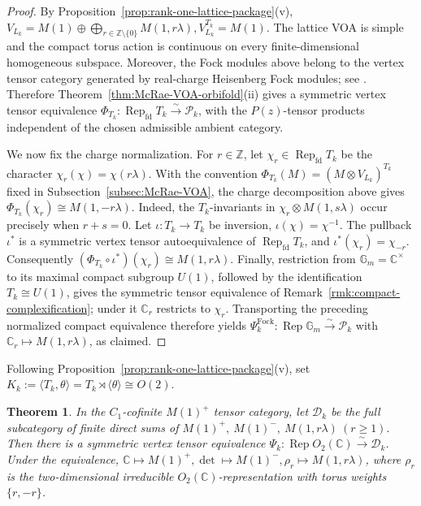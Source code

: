 \documentclass[12pt,leqno]{amsart}
\numberwithin{equation}{section} \newtheorem{thm}{Theorem}[section] \newtheorem{lem}[thm]{Lemma} \newtheorem{ex}[thm]{Example} \newtheorem{prop}[thm]{Proposition} \newtheorem{cor}[thm]{Corollary} \newtheorem{defi}[thm]{Definition} \newtheorem{rmk}[thm]{Remark} \newtheorem{notation}[thm]{Notation}
\newcommand{\Rep}{\operatorname{Rep}}
\newcommand{\Dk}{\mathcal D_k}
\newcommand{\Otwo}{O_2(\C)}
\def\Z{\mathbb{Z}} \def\N{\mathbb{N}} \def\A{\mathbb{A}} \def\C{\mathbb{C}} \def\R{\mathbb{R}} \def\Q{\mathbb{Q}} \def\F{\mathbb{F}}
\begin{document}
\begin{proof}
By Proposition~\ref{prop:rank-one-lattice-package}(v), \(V_{L_k}=M(1)\oplus\bigoplus_{r\in\Z\setminus\{0\}}M(1,r\lambda), V_{L_k}^{T_k}=M(1)\). The lattice VOA is simple and the compact torus action is continuous on every finite-dimensional homogeneous subspace. Moreover, the Fock modules above belong to the vertex tensor category generated by real-charge Heisenberg Fock modules; see \cite[Theorem~2.3]{CKLR}. Therefore Theorem~\ref{thm:McRae-VOA-orbifold}(ii) gives a symmetric vertex tensor equivalence \(\Phi_{T_k}:\Rep_{\mathrm{fd}}T_k\overset{\sim}{\longrightarrow}\mathcal P_k\), with the $P(z)$-tensor products independent of the chosen admissible ambient category.

We now fix the charge normalization. For \(r\in\Z\), let \(\chi_r\in\Rep_{\mathrm{fd}}T_k\) be the character \(\chi_r(\chi)=\chi(r\lambda)\). With the convention \(\Phi_{T_k}(M)=(M\otimes V_{L_k})^{T_k}\) fixed in Subsection~\ref{subsec:McRae-VOA}, the charge decomposition above gives \(\Phi_{T_k}(\chi_r)\cong M(1,-r\lambda)\). Indeed, the $T_k$-invariants in \(\chi_r\otimes M(1,s\lambda)\) occur precisely when \(r+s=0\). Let \(\iota:T_k\to T_k\) be inversion, \(\iota(\chi)=\chi^{-1}\). The pullback \(\iota^*\) is a symmetric vertex tensor autoequivalence of \(\Rep_{\mathrm{fd}}T_k\), and \(\iota^*(\chi_r)=\chi_{-r}\). Consequently \((\Phi_{T_k}\circ\iota^*)(\chi_r)\cong M(1,r\lambda)\). Finally, restriction from \(\mathbb G_m=\C^\times\) to its maximal compact subgroup $U(1)$, followed by the identification $T_k\cong U(1)$, gives the symmetric tensor equivalence of Remark~\ref{rmk:compact-complexification}; under it \(\C_r\) restricts to \(\chi_r\). Transporting the preceding normalized compact equivalence therefore yields \(\Psi_k^{\mathrm{Fock}}:\Rep\mathbb G_m\overset\sim\longrightarrow\mathcal P_k\) with \(\C_r\mapsto M(1,r\lambda)\), as claimed.
\end{proof}

Following Proposition~\ref{prop:rank-one-lattice-package}(v), set \(K_k:=\langle T_k,\theta\rangle=T_k\rtimes\langle\theta\rangle\cong O(2)\).
\begin{thm}\label{thm:O2-category}
In the $C_1$-cofinite $M(1)^+$ tensor category, let $\Dk$ be the full subcategory of finite direct sums of \(M(1)^+,\ M(1)^-,\ M(1,r\lambda)\ (r\ge1).\) Then there is a symmetric vertex tensor equivalence \(\Psi_k:\Rep\Otwo\overset\sim\longrightarrow\Dk\). Under the equivalence, \(\C\longmapsto M(1)^+,\det\longmapsto M(1)^-,\rho_r\longmapsto M(1,r\lambda)\), where $\rho_r$ is the two-dimensional irreducible $\Otwo$-representation with torus weights $\{r,-r\}$.
\end{thm}
\end{document}
